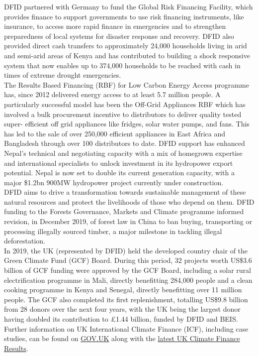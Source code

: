 DFID partnered with Germany to fund the Global Risk Financing Facility, which provides finance to support governments to use risk financing instruments, like insurance, to access more rapid finance in emergencies and to strengthen preparedness of local systems for disaster response and recovery. %
DFID also provided direct cash transfers to approximately 24,000 households living in arid and semi-arid areas of Kenya and has contributed to building a shock responsive system that now enables up to 374,000 households to be reached with cash in times of extreme drought emergencies. \\%

The Results Based Financing (RBF) for Low Carbon Energy Access programme has, since 2012 delivered energy access to at least 5.7 million people. %
A particularly successful model has been the Off-Grid Appliances RBF which has involved a bulk procurement incentive to distributors to deliver quality tested super- efficient off grid appliances like fridges, solar water pumps, and fans. This has led to the sale of over 250,000 efficient appliances in East Africa and Bangladesh through over 100 distributors to date. %
DFID support has enhanced Nepal's technical and negotiating capacity with a mix of homegrown expertise and international specialists to unlock investment in its hydropower export potential. %
Nepal is now set to double its current generation capacity, with a major \$1.2bn 900MW hydropower project currently under construction. \\%

DFID aims to drive a transformation towards sustainable management of these natural resources and protect the livelihoods of those who depend on them. %
DFID funding to the Forests Governance, Markets and Climate programme informed revision, in December 2019, of forest law in China to ban buying, transporting or processing illegally sourced timber, a major milestone in tackling illegal deforestation. \\%

In 2019, the UK (represented by DFID) held the developed country chair of the Green Climate Fund (GCF) Board. %
During this period, 32 projects worth US\$3.6 billion of GCF funding were approved by the GCF Board, including a solar rural electrification programme in Mali, directly benefitting 284,000 people and a clean cooking programme in Kenya and Senegal, directly benefitting over 11 million people. %
The GCF also completed its first replenishment, totalling US\$9.8 billion from 28 donors over the next four years, with the UK being the largest donor having doubled its contribution to \pounds 1.44 billion, funded by DFID and BEIS. \\%

Further information on UK International Climate Finance (ICF), including case studies, can be found on \href{https://www.gov.uk/guidance/international-climate-finance#our-portfolio-across-the-world}{GOV.UK} along with the \href{https://www.gov.uk/government/publications/uk-climate-finance-results}{latest UK Climate Finance Results}. %


\newpage
